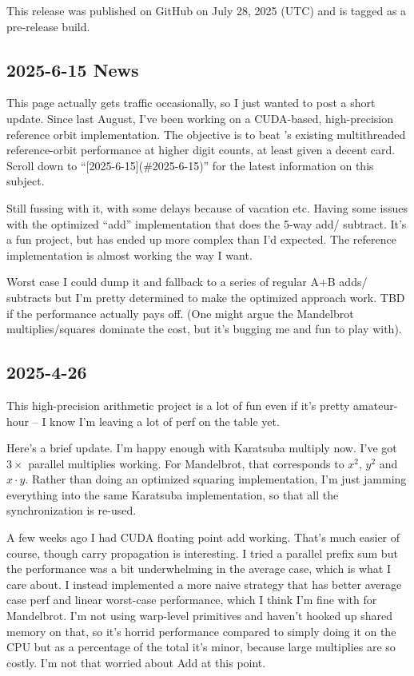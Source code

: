 This release was published on GitHub on July 28, 2025 (UTC) and is tagged as a
pre-release build.  


\subsection{2025-6-15 News}

This page actually gets traffic occasionally, so I just wanted to post a short 
update.  Since last August, I've been working on a CUDA-based, high-precision 
reference orbit implementation.  The objective is to beat \FractalShark{}'s 
existing multithreaded reference-orbit performance at higher digit counts, at 
least given a decent card.  Scroll down to ``[2025-6-15](\#2025-6-15)'' 
for the latest information on this subject.

Still fussing with it, with some delays because of vacation etc.  Having some 
issues with the optimized ``add'' implementation that does the 5-way add/
subtract.  It's a fun project, but has ended up more complex than I'd 
expected.  The reference implementation is almost working the way I want.

Worst case I could dump it and fallback to a series of regular A+B adds/
subtracts but I'm pretty determined to make the optimized approach work.  TBD 
if the performance actually pays off.  (One might argue the 
Mandelbrot multiplies/squares dominate the cost, but it's bugging me and fun to 
play with).

\subsection{2025-4-26}

This high-precision arithmetic project is a lot of fun even if it's pretty 
amateur-hour -- I know I'm leaving a lot of perf on the table yet.

Here's a brief update.  I'm happy enough with Karatsuba multiply now.  I've got 
$3\times$ parallel multiplies working.  For Mandelbrot, that corresponds to $x^2
$, $y^2$ and $x\cdot y$.  Rather than doing an optimized squaring 
implementation, I'm just jamming everything into the same Karatsuba 
implementation, so that all the synchronization is re-used.

A few weeks ago I had CUDA floating point add working.  That's much easier of 
course, though carry propagation is interesting.  I tried a parallel prefix sum 
but the performance was a bit underwhelming in the average case, which is what 
I care about.  I instead implemented a more naive strategy that has better 
average case perf and linear worst-case performance, which I think I'm fine 
with for Mandelbrot.  I'm not using warp-level primitives and haven't hooked up 
shared memory on that, so it's horrid performance compared to simply doing it 
on the CPU but as a percentage of the total it's minor, because large 
multiplies are so costly.  I'm not that worried about Add at this point.

